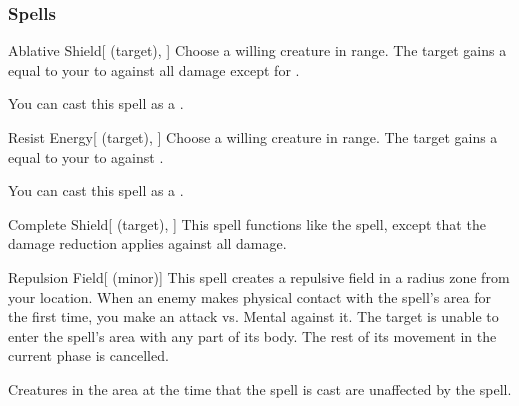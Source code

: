 \subsubsection{Spells}


\lowercase{\hypertarget{spell:Ablative Shield}{}}\label{spell:Ablative Shield}
\begin{attuneability}[\nth{1}]{\hypertarget{spell:Ablative Shield}{Ablative Shield}}[ (target), ]
Choose a willing creature in \rngclose range.
The target gains a  equal to your  to  against all damage except for .

You can cast this spell as a .
\end{attuneability}
\vspace{0.25em}



\lowercase{\hypertarget{spell:Resist Energy}{}}\label{spell:Resist Energy}
\begin{attuneability}[\nth{1}]{\hypertarget{spell:Resist Energy}{Resist Energy}}[ (target), ]
Choose a willing creature in \rngclose range.
The target gains a  equal to your  to  against .

You can cast this spell as a .
\end{attuneability}
\vspace{0.25em}



\lowercase{\hypertarget{spell:Complete Shield}{}}\label{spell:Complete Shield}
\begin{attuneability}[\nth{2}]{\hypertarget{spell:Complete Shield}{Complete Shield}}[ (target), ]
This spell functions like the  spell, except that the damage reduction applies against all damage.
\end{attuneability}
\vspace{0.25em}



\lowercase{\hypertarget{spell:Repulsion Field}{}}\label{spell:Repulsion Field}
\begin{apability}[\nth{2}]{\hypertarget{spell:Repulsion Field}{Repulsion Field}}[ (minor)]
This spell creates a repulsive field in a \areamed radius zone from your location.
When an enemy makes physical contact with the spell's area for the first time, you make an attack vs. Mental against it.
\hit The target is unable to enter the spell's area with any part of its body.
The rest of its movement in the current phase is cancelled.

Creatures in the area at the time that the spell is cast are unaffected by the spell.
\end{apability}
\vspace{0.25em}



